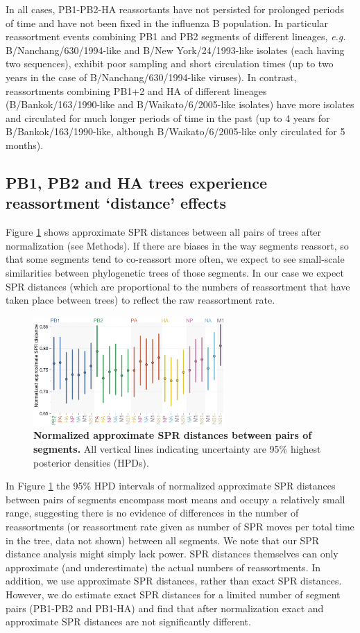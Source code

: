 \documentclass[11pt,oneside,letterpaper]{article}
\begin{document}
In all cases, PB1-PB2-HA reassortants have not persisted for prolonged periods of time and have not been fixed in the influenza B population.
In particular reassortment events combining PB1 and PB2 segments of different lineages, \textit{e.g.} B/Nanchang/630/1994-like and B/New York/24/1993-like isolates (each having two sequences), exhibit poor sampling and short circulation times (up to two years in the case of B/Nanchang/630/1994-like viruses).
In contrast, reassortments combining PB1+2 and HA of different lineages (B/Bankok/163/1990-like and B/Waikato/6/2005-like isolates) have more isolates and circulated for much longer periods of time in the past (up to 4 years for B/Bankok/163/1990-like, although B/Waikato/6/2005-like only circulated for 5 months).

\subsection*{PB1, PB2 and HA trees experience reassortment `distance' effects}
Figure \ref{SPRdistances} shows approximate SPR distances between all pairs of trees after normalization (see Methods).
If there are biases in the way segments reassort, so that some segments tend to co-reassort more often, we expect to see small-scale similarities between phylogenetic trees of those segments.
In our case we expect SPR distances (which are proportional to the numbers of reassortment that have taken place between trees) to reflect the raw reassortment rate.

\begin{figure}[h]
	\centering		
	\includegraphics[width=0.65\textwidth]{figures/InfB_normalizedApproxSPR.png}
	\caption{\textbf{Normalized approximate SPR distances between pairs of segments.}
All vertical lines indicating uncertainty are 95\% highest posterior densities (HPDs).}
	\label{SPRdistances}
\end{figure}

In Figure \ref{SPRdistances} the 95\% HPD intervals of normalized approximate SPR distances between pairs of segments encompass most means and occupy a relatively small range, suggesting there is no evidence of differences in the number of reassortments (or reassortment rate given as number of SPR moves per total time in the tree, data not shown) between all segments.
We note that our SPR distance analysis might simply lack power.
SPR distances themselves can only approximate (and underestimate) the actual numbers of reassortments.
In addition, we use approximate SPR distances, rather than exact SPR distances.
However, we do estimate exact SPR distances for a limited number of segment pairs (PB1-PB2 and PB1-HA) and find that after normalization exact and approximate SPR distances are not significantly different. 
\end{document}
